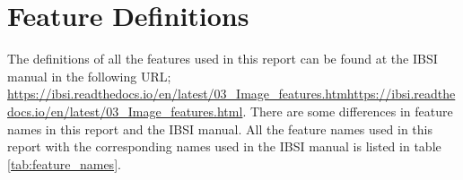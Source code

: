 
\appendix
\section{Feature Definitions} \label{sec:appendix_feature_definitions} 


The definitions of all the features used in this report can be found at the
IBSI manual in the following URL;
\url{https://ibsi.readthedocs.io/en/latest/03_Image_features.htmhttps://ibsi.readthedocs.io/en/latest/03_Image_features.html}.
There are some differences in feature names in this report and the IBSI manual.
All the feature names used in this report with the corresponding names used in
the IBSI manual is listed in table \ref{tab:feature_names}. 


